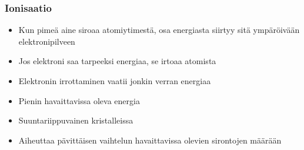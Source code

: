 \documentclass[beamer,11pt,aspectratio=169]{beamer}
\newcommand{\defaultbgcolor}{grey1}
\begin{document}
\begin{frame}
\end{frame}

\begin{frame}
    \frametitle{Ionisaatio}
    \begin{itemize}
        \item Kun pimeä aine siroaa atomiytimestä, osa energiasta siirtyy sitä ympäröivään elektronipilveen
        \item Jos elektroni saa tarpeeksi energiaa, se irtoaa atomista
        \item Elektronin irrottaminen vaatii jonkin verran energiaa
        \item Pienin havaittavissa oleva energia
        \item Suuntariippuvainen kristalleissa
        \item Aiheuttaa pävittäisen vaihtelun havaittavissa olevien sirontojen määrään
    \end{itemize}
\end{frame}
\end{document}
